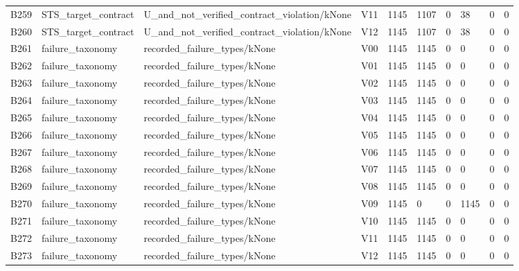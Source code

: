 \begin{longtable}{llllllllll}
B259 & STS\_target\_contract & U\_and\_not\_verified\_contract\_violation/kNone & V11 & 1145 & 1107 & 0 & 38 & 0 & 0 \\
B260 & STS\_target\_contract & U\_and\_not\_verified\_contract\_violation/kNone & V12 & 1145 & 1107 & 0 & 38 & 0 & 0 \\
B261 & failure\_taxonomy & recorded\_failure\_types/kNone & V00 & 1145 & 1145 & 0 & 0 & 0 & 0 \\
B262 & failure\_taxonomy & recorded\_failure\_types/kNone & V01 & 1145 & 1145 & 0 & 0 & 0 & 0 \\
B263 & failure\_taxonomy & recorded\_failure\_types/kNone & V02 & 1145 & 1145 & 0 & 0 & 0 & 0 \\
B264 & failure\_taxonomy & recorded\_failure\_types/kNone & V03 & 1145 & 1145 & 0 & 0 & 0 & 0 \\
B265 & failure\_taxonomy & recorded\_failure\_types/kNone & V04 & 1145 & 1145 & 0 & 0 & 0 & 0 \\
B266 & failure\_taxonomy & recorded\_failure\_types/kNone & V05 & 1145 & 1145 & 0 & 0 & 0 & 0 \\
B267 & failure\_taxonomy & recorded\_failure\_types/kNone & V06 & 1145 & 1145 & 0 & 0 & 0 & 0 \\
B268 & failure\_taxonomy & recorded\_failure\_types/kNone & V07 & 1145 & 1145 & 0 & 0 & 0 & 0 \\
B269 & failure\_taxonomy & recorded\_failure\_types/kNone & V08 & 1145 & 1145 & 0 & 0 & 0 & 0 \\
B270 & failure\_taxonomy & recorded\_failure\_types/kNone & V09 & 1145 & 0 & 0 & 1145 & 0 & 0 \\
B271 & failure\_taxonomy & recorded\_failure\_types/kNone & V10 & 1145 & 1145 & 0 & 0 & 0 & 0 \\
B272 & failure\_taxonomy & recorded\_failure\_types/kNone & V11 & 1145 & 1145 & 0 & 0 & 0 & 0 \\
B273 & failure\_taxonomy & recorded\_failure\_types/kNone & V12 & 1145 & 1145 & 0 & 0 & 0 & 0 \\
\hline\end{longtable}

